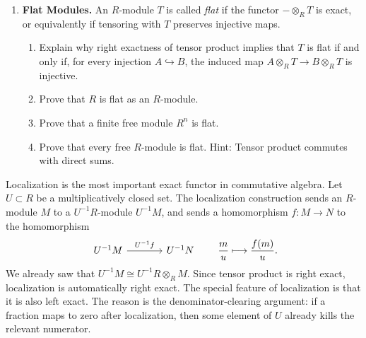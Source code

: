 \documentclass[12pt,reqno]{amsart}
\begin{document}
\begin{enumerate}[leftmargin=*, resume=problems]
\item \textbf{Flat Modules.} An $R$-module $T$ is called \emph{flat} if the functor $-\otimes_R T$ is exact, or equivalently if tensoring with $T$ preserves injective maps.
\begin{enumerate}
\item Explain why right exactness of tensor product implies that $T$ is flat if and only if, for every injection $A\hookrightarrow B$, the induced map $A\otimes_R T \to B\otimes_R T$ is injective.
\item Prove that $R$ is flat as an $R$-module. 
\item Prove that a finite free module $R^n$ is flat.
\item Prove that every free $R$-module is flat. Hint: Tensor product commutes with direct sums.
\end{enumerate}

\end{enumerate}

\hrulefill

Localization is the most important exact functor in commutative algebra. Let $U\subset R$ be a multiplicatively closed set. The localization construction sends an $R$-module $M$ to a $U^{-1}R$-module $U^{-1}M$, and sends a homomorphism $f:M\to N$ to the homomorphism
\[
\begin{tikzcd}[column sep=large]
U^{-1}M \arrow[r, "U^{-1}f"] & U^{-1}N
\end{tikzcd}
\qquad
\frac{m}{u}\longmapsto \frac{f(m)}{u}.
\]
We already saw that $U^{-1}M\cong U^{-1}R\otimes_R M$. Since tensor product is right exact, localization is automatically right exact. The special feature of localization is that it is also left exact. The reason is the denominator-clearing argument: if a fraction maps to zero after localization, then some element of $U$ already kills the relevant numerator.

\hrulefill
\end{document}

